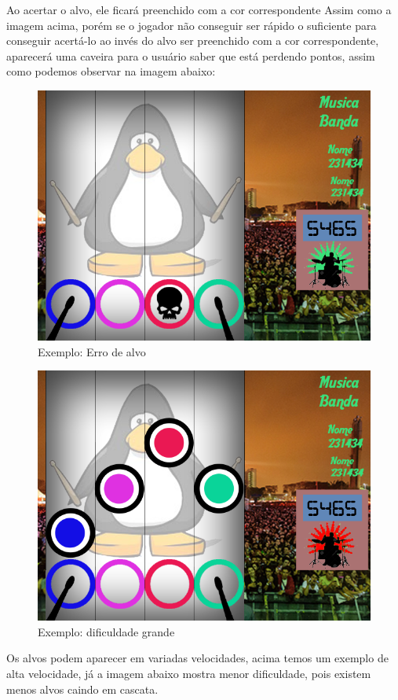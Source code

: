 \documentclass{sciposter}
\begin{document}
\begin{multicols}{3}
Ao acertar o alvo, ele ficará preenchido com a cor correspondente  Assim como a imagem acima, porém se o jogador não conseguir ser rápido o suficiente para conseguir acertá-lo ao invés do alvo ser preenchido com a cor correspondente, aparecerá uma caveira para o usuário saber que está perdendo pontos, assim como podemos observar na imagem abaixo:



\begin{figure}[!htb]
\centering
\includegraphics[scale=2.3]{ErrorCase.png}
\caption{Exemplo: Erro de alvo}
\end{figure}

\begin{figure}[!htb]
\centering
\includegraphics[scale=2.3]{BadCase.png}
\caption{Exemplo: dificuldade grande}
\end{figure}
Os alvos podem aparecer em variadas velocidades, acima temos um exemplo de alta velocidade, já a imagem abaixo mostra menor dificuldade, pois existem menos alvos caindo em cascata.


\end{multicols}
\end{document}
